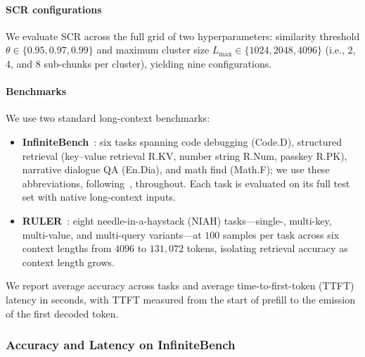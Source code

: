 \documentclass[10pt,conference]{IEEEtran}
\begin{document}
\paragraph{SCR configurations}
We evaluate SCR across the full grid of two hyperparameters:
similarity threshold $\theta \in \{0.95, 0.97, 0.99\}$ and maximum
cluster size $L_{\max} \in \{1024, 2048, 4096\}$ (i.e., $2$, $4$, and
$8$ sub-chunks per cluster), yielding nine configurations.

\paragraph{Benchmarks} 
We use two standard long-context benchmarks:
\begin{itemize}
    \item \textbf{InfiniteBench}~\cite{zhang_etal_2024_bench}: six tasks
    spanning code debugging (Code.D), structured retrieval
    (key--value retrieval R.KV, number string R.Num, passkey R.PK),
    narrative dialogue QA (En.Dia), and math find (Math.F); we use these
    abbreviations, following~\cite{tokenselect2025}, throughout. Each
    task is evaluated on its full test set with native long-context
    inputs.
    \item \textbf{RULER}~\cite{ruler2024}: eight needle-in-a-haystack
    (NIAH) tasks---single-, multi-key, multi-value, and multi-query
    variants---at $100$ samples per task across six context lengths from
    $4096$ to $131{,}072$ tokens, isolating retrieval accuracy as
    context length grows.
\end{itemize}
We report average accuracy across tasks and average time-to-first-token 
(TTFT) latency in seconds, with TTFT measured from the start of 
prefill to the emission of the first decoded token.


\subsubsection{Accuracy and Latency on InfiniteBench}
\label{subsec:exp-infinitebench}
\end{document}

